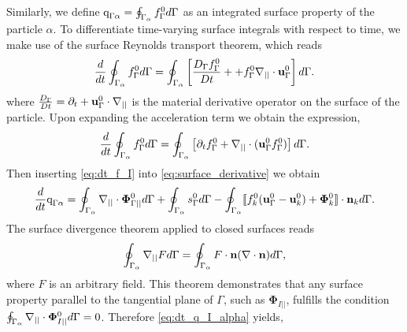 Similarly, we define $\text q_{\Gamma\alpha} = \oint_{\Gamma_{\alpha}}  f_\Gamma^0 d\Gamma$ as an integrated surface property of the particle $\alpha$.
To differentiate time-varying surface integrals with respect to time, we make use of the surface Reynolds transport theorem, which reads \citep[Appendix B]{morel2015mathematical} %
\begin{equation}
    \ddt  \intS{f_\Gamma^0 }
    = \intS{ \left[
        \frac{D_\Gamma f_\Gamma^0}{Dt}+
        +   f_\Gamma^0\gradI \cdot \textbf{u}_\Gamma^0
    \right]}.
    \label{eq:surface_derivative}
\end{equation}
where $\frac{D_\Gamma}{Dt}  = \partial_t + \textbf{u}_\Gamma^0\cdot \mathbf{\nabla}_{||} $ is the material derivative operator on the surface of the particle. 
Upon expanding the acceleration term we obtain the expression,
\begin{equation}
    \ddt  \intS{f_\Gamma^0 }
    = \intS{ \left[
        \pddt f_\Gamma^0
        +   \gradI \cdot (\textbf{u}_\Gamma^0f_\Gamma^0)
    \right]}.
    \label{eq:surface_derivative}
\end{equation}
Then inserting \ref{eq:dt_f_I} into \ref{eq:surface_derivative} we obtain
\begin{equation}
    \ddt  \text q_{\Gamma\alpha}
    = \intS{ 
        \gradI \cdot \boldsymbol{\Phi}_{\Gamma||}^0
    }
    +\intS{ 
        s_\Gamma^0
    }
    - \intS{
 \Jump{
        f_k^0 (\textbf{u}_\Gamma^0 - \textbf{u}_k^0)
        + \mathbf{\Phi}_k^0
    }
    }.
    \label{eq:dt_q_I_alpha}
\end{equation}
The surface divergence theorem applied to closed surfaces  reads \citep{nadim1996concise}
\begin{equation}
    \intS{\gradI F}
    = 
    \intS{ F \cdot\textbf{n} (\div \textbf{n})},
    \label{eq:gauss_surface}
\end{equation} 
where $F$ is an arbitrary field.
This theorem demonstrates that any surface property parallel to the tangential plane of $\Gamma$, such as $\bm\Phi_{I||}$, fulfills the condition $\oint_{\Gamma_{\alpha}} \mathbf{\nabla}_{||}\cdot \bm\Phi_{I||}^0 d\Gamma
= 0$.
Therefore \ref{eq:dt_q_I_alpha} yields,%

